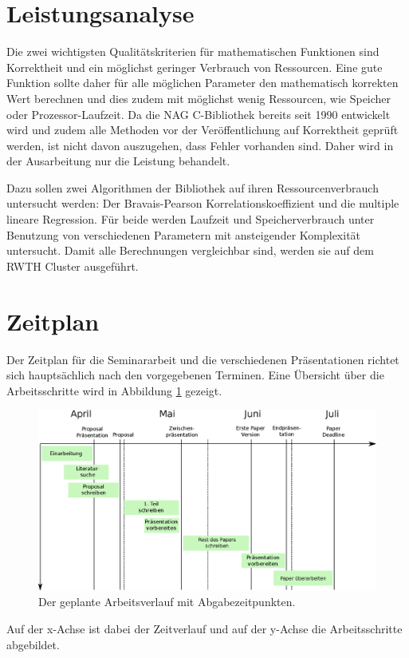 \documentclass{article}
\begin{document}
\section{Leistungsanalyse}

Die zwei wichtigsten Qualitätskriterien für mathematischen Funktionen sind Korrektheit und ein möglichst geringer Verbrauch von Ressourcen.
Eine gute Funktion sollte daher für alle möglichen Parameter den mathematisch korrekten Wert berechnen und dies zudem mit möglichst wenig Ressourcen, wie Speicher oder Prozessor-Laufzeit.
Da die NAG C-Bibliothek bereits seit 1990 entwickelt wird\cite{Wikipedia:nag} und zudem alle Methoden vor der Veröffentlichung auf Korrektheit geprüft werden\cite{NAG2011}, ist nicht davon auszugehen, dass Fehler vorhanden sind.
Daher wird in der Ausarbeitung nur die Leistung behandelt.

Dazu sollen zwei Algorithmen der Bibliothek auf ihren Ressourcenverbrauch untersucht werden: Der Bravais-Pearson Korrelationskoeffizient und die multiple lineare Regression.
Für beide werden Laufzeit und Speicherverbrauch unter Benutzung von verschiedenen Parametern mit ansteigender Komplexität untersucht.
Damit alle Berechnungen vergleichbar sind, werden sie auf dem RWTH Cluster ausgeführt.

\section{Zeitplan}

Der Zeitplan für die Seminararbeit und die verschiedenen Präsentationen richtet sich hauptsächlich nach den vorgegebenen Terminen.
Eine Übersicht über die Arbeitsschritte wird in Abbildung \ref{fig:Zeitplan} gezeigt.
\begin{figure}[t]
 \includegraphics[width=\linewidth]{./figures/Workplan-adj-small.eps}
 \caption{Der geplante Arbeitsverlauf mit Abgabezeitpunkten.}
 \label{fig:Zeitplan} 
\end{figure}
Auf der x-Achse ist dabei der Zeitverlauf und auf der y-Achse die Arbeitsschritte abgebildet.
\end{document}
